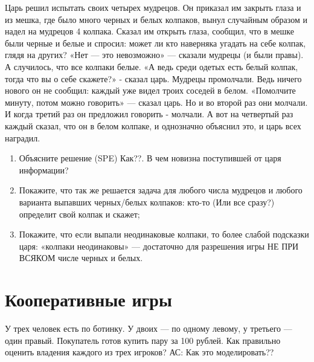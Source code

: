 \begin{problem} [Колпаки]
\begin{source} \cite{myerson:gtac} \end{source}
 Царь решил испытать своих
четырех мудрецов. Он приказал им закрыть глаза и из мешка,
где было много черных и белых колпаков, вынул случайным
образом и надел на мудрецов 4 колпака. Сказал им открыть
глаза, сообщил, что в мешке были черные и белые и спросил:
может ли кто наверняка угадать на себе колпак, глядя на
других? «Нет — это невозможно» — сказали мудрецы (и были
правы). А случилось, что все колпаки белые. «А ведь среди
одетых есть белый колпак, тогда что вы о себе скажете?» -
сказал царь. Мудрецы промолчали. Ведь ничего нового он не
сообщил: каждый уже видел троих соседей в белом. «Помолчите
минуту, потом можно говорить» — сказал царь. Но и во второй
раз они молчали. И когда третий раз он предложил говорить -
молчали. А вот на четвертый раз каждый сказал, что он в
белом колпаке, и однозначно объяснил это, и царь всех
наградил.

\begin{enumerate}

\item Объясните решение (SPE) {\red Как??}. В чем новизна
поступившей от царя информации?

\item Покажите, что так же
решается задача для любого числа мудрецов и любого варианта
выпавших черных/белых колпаков: кто-то ({\red Или все сразу?}) определит свой
колпак и скажет;

\item Покажите, что если выпали неодинаковые
колпаки, то более слабой подсказки царя: «колпаки
неодинаковы» — достаточно для разрешения игры НЕ ПРИ ВСЯКОМ
числе черных и белых.
\end{enumerate}



\begin{sol}

\end{sol}
\end{problem}






\section{Кооперативные игры}

\begin{problem}[Ботинки]
У трех человек есть по ботинку. У двоих — по одному левому, у третьего — один правый. Покупатель готов купить пару за 100 рублей. Как правильно оценить владения каждого из трех игроков?
{\red АС: Как это моделировать??}



\begin{sol}

\end{sol}
\end{problem}



